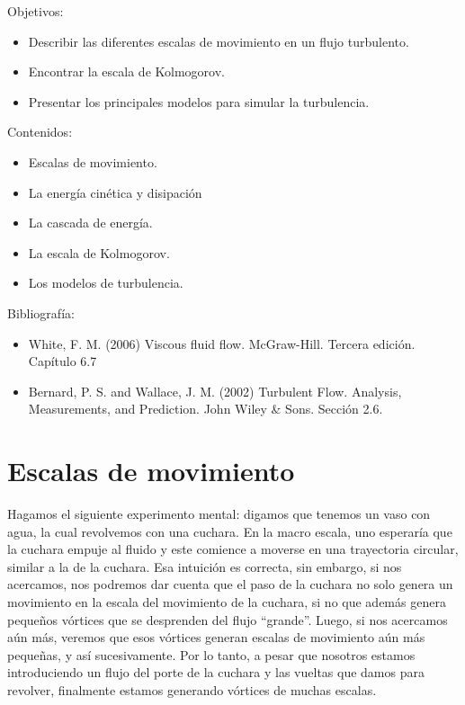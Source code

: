 \begin{framed}

Objetivos:
\begin{itemize}
    \item Describir las diferentes escalas de movimiento en un flujo turbulento.
    \item Encontrar la escala de Kolmogorov.
    \item Presentar los principales modelos para simular la turbulencia. 
\end{itemize}

Contenidos:
\begin{itemize}
    \item Escalas de movimiento.
    \item La energía cinética y disipación
    \item La cascada de energía.
    \item La escala de Kolmogorov.
    \item Los modelos de turbulencia.
\end{itemize}

Bibliografía:
\begin{itemize}
    \item White, F. M. (2006) Viscous fluid flow. McGraw-Hill. Tercera edición. Capítulo 6.7
    \item Bernard, P. S. and Wallace, J. M. (2002) Turbulent Flow. Analysis, Measurements, and Prediction. John Wiley \& Sons. Sección 2.6.
\end{itemize}
\end{framed}

\section*{Escalas de movimiento}

Hagamos el siguiente experimento mental: digamos que tenemos un vaso con agua, la cual revolvemos con una cuchara.
En la macro escala, uno esperaría que la cuchara empuje al fluido y este comience a moverse en una trayectoria circular, similar a la de la cuchara.
Esa intuición es correcta, sin embargo, si nos acercamos, nos podremos dar cuenta que el paso de la cuchara no solo genera un movimiento en la escala del movimiento de la cuchara, si no que además genera pequeños vórtices que se desprenden del flujo ``grande''.
Luego, si nos acercamos aún más, veremos que esos vórtices generan escalas de movimiento aún más pequeñas, y así sucesivamente.
Por lo tanto, a pesar que nosotros estamos introduciendo un flujo del porte de la cuchara y las vueltas que damos para revolver, finalmente estamos generando vórtices de muchas escalas.

